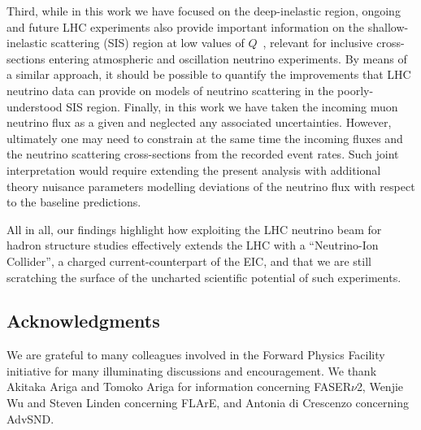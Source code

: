 Third, while in this work we have focused on the deep-inelastic
region, ongoing and future LHC experiments also provide
important information on the shallow-inelastic scattering (SIS)
region at low values of $Q$~\cite{Candido:2023utz}, relevant for inclusive cross-sections
entering atmospheric and oscillation neutrino experiments.
%
By means of a similar approach, it should be possible to quantify
the improvements that LHC neutrino data can provide on models
of neutrino scattering in the poorly-understood SIS region.
%
Finally, in this work we have taken the incoming muon neutrino flux
as a given and neglected any associated uncertainties.
%
However, ultimately one may need to constrain at the same time
the incoming fluxes and the neutrino scattering cross-sections
from the recorded event rates.
%
Such joint interpretation would require extending the present
analysis with additional theory nuisance parameters modelling
deviations of the neutrino flux with respect to the baseline predictions.

All in all, our findings highlight how exploiting
the LHC neutrino beam for hadron structure studies effectively
extends the LHC with a ``Neutrino-Ion Collider'', a charged
current-counterpart of the EIC, and that we are still
scratching the surface of the uncharted
scientific potential of such experiments.

\subsection*{Acknowledgments}
%
We are grateful to many colleagues involved in the Forward
Physics Facility initiative for many illuminating
discussions and encouragement.
%
We thank Akitaka Ariga and Tomoko Ariga for information
concerning FASER$\nu$2,
Wenjie Wu and Steven Linden concerning FLArE,
and Antonia di Crescenzo concerning AdvSND.
